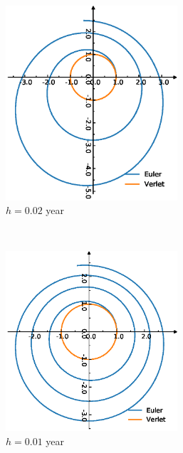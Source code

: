 \begin{figure}[tb]
	\begin{subfigure}[tb]{0.5\textwidth}
		\centering
		\includegraphics[width=0.7\textwidth]{Earth500.eps}
		\caption{$h = 0.02$ year}
		\label{fig:earth500}
	\end{subfigure}
~
	\begin{subfigure}[tb]{0.5\textwidth}
		\centering
		\includegraphics[width=0.7\textwidth]{Earth1000.eps}		\caption{$h = 0.01$ year}
		\label{fig:earth1000}
	\end{subfigure}
~
	\begin{subfigure}[tb]{0.5\textwidth}
		\centering

\end{subfigure}
\end{figure}
